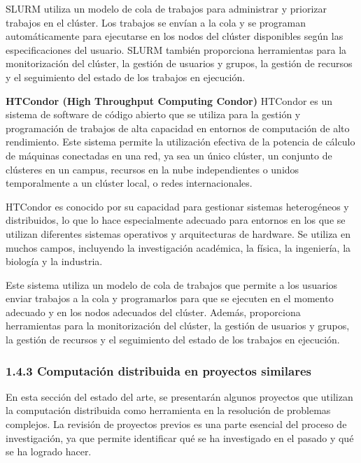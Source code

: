 \begin{spacing}{1.5}
\begin{multicols}{2}
  SLURM utiliza un modelo de cola de trabajos para administrar y priorizar trabajos en el clúster. Los trabajos se envían a la cola y se programan automáticamente para ejecutarse en los nodos del clúster disponibles según las especificaciones del usuario. SLURM también proporciona herramientas para la monitorización del clúster, la gestión de usuarios y grupos, la gestión de recursos y el seguimiento del estado de los trabajos en ejecución.
  \vspace{3mm}

  \textbf{HTCondor (High Throughput Computing Condor)}
  \newline
  HTCondor es un sistema de software de código abierto que se utiliza para la gestión y programación de trabajos de alta capacidad en entornos de computación de alto rendimiento. Este sistema permite la utilización efectiva de la potencia de cálculo de máquinas conectadas en una red, ya sea un único clúster, un conjunto de clústeres en un campus, recursos en la nube independientes o unidos temporalmente a un clúster local, o redes internacionales.

  HTCondor es conocido por su capacidad para gestionar sistemas heterogéneos y distribuidos, lo que lo hace especialmente adecuado para entornos en los que se utilizan diferentes sistemas operativos y arquitecturas de hardware. Se utiliza en muchos campos, incluyendo la investigación académica, la física, la ingeniería, la biología y la industria.

  Este sistema utiliza un modelo de cola de trabajos que permite a los usuarios enviar trabajos a la cola y programarlos para que se ejecuten en el momento adecuado y en los nodos adecuados del clúster. Además, proporciona herramientas para la monitorización del clúster, la gestión de usuarios y grupos, la gestión de recursos y el seguimiento del estado de los trabajos en ejecución.

  \subsubsection{1.4.3 Computación distribuida en proyectos similares}

  En esta sección del estado del arte, se presentarán algunos proyectos que utilizan la computación distribuida como herramienta en la resolución de problemas complejos. La revisión de proyectos previos es una parte esencial del proceso de investigación, ya que permite identificar qué se ha investigado en el pasado y qué se ha logrado hacer.


\end{multicols}
\end{spacing}
